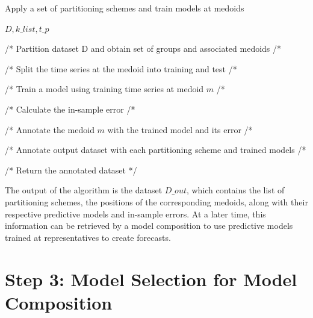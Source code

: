 \begin{algorithm}[h!]
\caption{Apply a set of partitioning schemes and train models at medoids}\label{alg:trainModelsAtMedoids}
\begin{algorithmic}[1] 
 {$D,k\_list,t\_p$}

 

 /* Partition dataset D and obtain set of groups and associated medoids /*
 
 
 /* Split the time series at the medoid into training and test /*
 
 /* Train a model using training time series at medoid $m$ /*
 
 /* Calculate the in-sample error /*
 
 /* Annotate the medoid $m$ with the trained model and its error /*
 \EndFor
 
 /* Annotate output dataset with each partitioning scheme and trained models /*
 
\EndFor

/* Return the annotated dataset */
\EndFunction 
\end{algorithmic} 
\end{algorithm} 

The output of the algorithm is the dataset $D\_out$, which contains the list of partitioning schemes, the positions of the corresponding medoids, along with their respective predictive models and in-sample errors. At a later time, this information can be retrieved by a model composition to use predictive models trained at representatives to create forecasts.

\section{Step 3: Model Selection for Model Composition}
\label{Sec:KnowledgExtraction}

